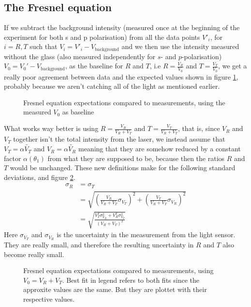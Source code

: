 \subsection{The Fresnel equation}
If we subtract the background intensity (measured once at the beginning of the experiment for both s and p polarisation) from all the data points $V'_i$, for $i = R,T$ such that $V_i = V'_i - V_{\text{background}}$ and we then use the intensity measured without the glass (also measured independently for $s$- and $p$-polarisation) $V_{0} = V_{0}' - V_{\text{background}}$, as the baseline for $R$ and $T$, i.e $R = \frac{V_R}{V_0}$ and $T = \frac{V_T}{V_0}$, we get a really poor agreement between data and the expected values shown in figure \ref{fig:bad_fresnel_comparison}, probably because we aren't catching all of the light as mentioned earlier.
   \begin{figure}[h]
        
        
        \centering
        \caption{Fresnel equation expectations compared to measurements, using the measured $V_0$ as baseline}
        \label{fig:bad_fresnel_comparison}
    \end{figure}
What works way better is using $R = \frac{V_R}{V_R + V_T}$ and $T = \frac{V_T}{V_R + V_T}$, that is, since $V_R$ and $V_T$ together isn't the total intensity from the laser, we instead assume that $V_T = \alpha \tilde{V_T}$ and $V_R = \alpha \tilde{V_R}$ meaning that they are somehow reduced by a constant factor $\alpha(\theta_1)$ from what they are supposed to be, because then the ratios $R$ and $T$ would be unchanged.
These new definitions make for the following standard deviations, and figure \ref{fig:fresnell_comparison}. 
\begin{align*}
\sigma_R &= \sigma_T\\ 
&= \sqrt{\left( \frac{V_R}{V_R + V_T} \sigma_{V_T} \right)^2 + \left( \frac{V_T}{V_R + V_T} \sigma_{V_R} \right)^2}\\
&= \sqrt{\frac{V_T^2\sigma_{V_R}^2 + V_R^2\sigma_{V_T}^2 }{(V_R + V_T)^2}}
\end{align*}
Here $\sigma_{V_T}$ and $\sigma_{V_R}$ is the uncertainty in the measurement from the light sensor. They are really small, and therefore the resulting uncertainty in $R$ and $T$ also become really small. 
   \begin{figure}[h]
        
        
        \centering
        \caption{Fresnel equation expectations compared to measurements, using $V_0 = V_R + V_T$. Best fit in legend refers to both fits since the approxite values are the same. But they are plottet with their respective values.}
        \label{fig:fresnell_comparison}
    \end{figure}\\
